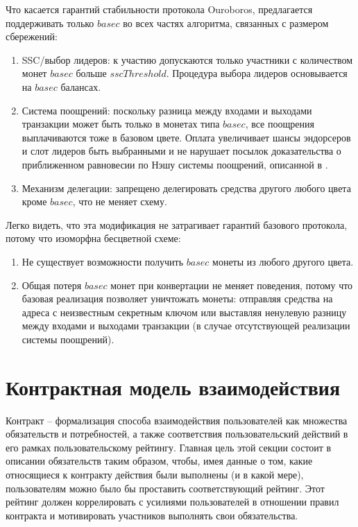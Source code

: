 \documentclass[specification,annotation]{itmo-student-thesis}
\begin{document}
Что касается гарантий стабильности протокола Ouroboros, предлагается
поддерживать только $basec$ во всех частях алгоритма, связанных с
размером сбережений:

\begin{enumerate}
\item SSC/выбор лидеров: к участию допускаются только участники с
  количеством монет $basec$ больше $sscThreshold$. Процедура выбора
  лидеров основывается на $basec$ балансах.
\item Система поощрений: поскольку разница между входами и выходами
  транзакции может быть только в монетах типа $basec$, все поощрения
  выплачиваются тоже в базовом цвете. Оплата увеличивает шансы
  эндорсеров и слот лидеров быть выбранными и не нарушает посылок
  доказательства о приближенном равновесии по Нэшу системы поощрений,
  описанной в \cite{ouroboros}.
\item Механизм делегации: запрещено делегировать средства другого
  любого цвета кроме $basec$, что не меняет схему.
\end{enumerate}

Легко видеть, что эта модификация не затрагивает гарантий базового
протокола, потому что изоморфна бесцветной схеме:

\begin{enumerate}
\item Не существует возможности получить $basec$ монеты из любого
  другого цвета.
\item Общая потеря $basec$ монет при конвертации не меняет поведения,
  потому что базовая реализация позволяет уничтожать монеты: отправляя
  средства на адреса с неизвестным секретным ключом или выставляя
  ненулевую разницу между входами и выходами транзакции (в случае
  отсутствующей реализации системы поощрений).
\end{enumerate}

\section{Контрактная модель взаимодействия}
\label{sec:contract}

Контракт -- формализация способа взаимодействия пользователей как
множества обязательств и потребностей, а также соответствия
пользовательский действий в его рамках пользовательскому
рейтингу. Главная цель этой секции состоит в описании обязательств
таким образом, чтобы, имея данные о том, какие относящиеся к контракту
действия были выполнены (и в какой мере), пользователям можно было бы
проставить соответствующий рейтинг. Этот рейтинг должен коррелировать
с усилиями пользователей в отношении правил контракта и мотивировать
участников выполнять свои обязательства.
\end{document}
